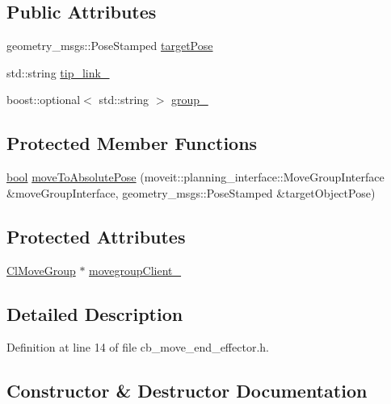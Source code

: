 \subsection*{Public Attributes}
\begin{DoxyCompactItemize}
\item 
geometry\+\_\+msgs\+::\+Pose\+Stamped \hyperlink{classmoveit__z__client_1_1CbMoveEndEffector_abea9c6077733077baced34c6098c6140}{target\+Pose}
\item 
std\+::string \hyperlink{classmoveit__z__client_1_1CbMoveEndEffector_abd92e9d3d67bdde11f9e38e0b44a2b8b}{tip\+\_\+link\+\_\+}
\item 
boost\+::optional$<$ std\+::string $>$ \hyperlink{classmoveit__z__client_1_1CbMoveEndEffector_ab2d23ae054dbc0c2a5f3e6bbc84e07dd}{group\+\_\+}
\end{DoxyCompactItemize}
\subsection*{Protected Member Functions}
\begin{DoxyCompactItemize}
\item 
\hyperlink{classbool}{bool} \hyperlink{classmoveit__z__client_1_1CbMoveEndEffector_a277108330d114671ed89dffb876a8a48}{move\+To\+Absolute\+Pose} (moveit\+::planning\+\_\+interface\+::\+Move\+Group\+Interface \&move\+Group\+Interface, geometry\+\_\+msgs\+::\+Pose\+Stamped \&target\+Object\+Pose)
\end{DoxyCompactItemize}
\subsection*{Protected Attributes}
\begin{DoxyCompactItemize}
\item 
\hyperlink{classmoveit__z__client_1_1ClMoveGroup}{Cl\+Move\+Group} $\ast$ \hyperlink{classmoveit__z__client_1_1CbMoveEndEffector_af62a434c16849885a085e30b8ae70e00}{movegroup\+Client\+\_\+}
\end{DoxyCompactItemize}


\subsection{Detailed Description}


Definition at line 14 of file cb\+\_\+move\+\_\+end\+\_\+effector.\+h.



\subsection{Constructor \& Destructor Documentation}
\mbox{\label{classmoveit__z__client_1_1CbMoveEndEffector_acd25310b5088e3eeaa75220d283546e8}} 
